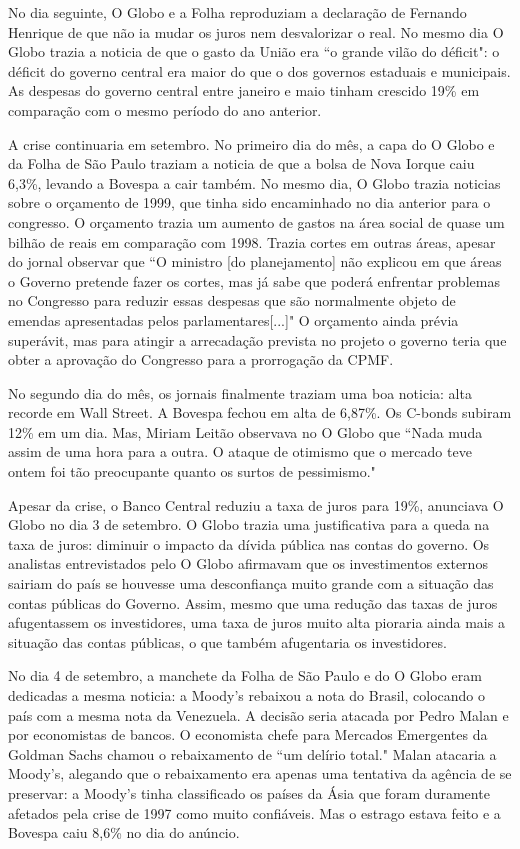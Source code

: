 \documentclass{article}
\begin{document}
No dia seguinte, O Globo e a Folha reproduziam a declaração de Fernando Henrique de que não ia mudar os juros nem desvalorizar o real. No mesmo dia O Globo trazia a noticia de que o gasto da União era ``o grande vilão do déficit": o déficit do governo central era maior do que o dos governos estaduais e municipais. As despesas do governo central entre janeiro e maio tinham crescido 19\% em comparação com o mesmo período do ano anterior.

A crise continuaria em setembro. No primeiro dia do mês, a capa do O Globo e da Folha de São Paulo traziam a noticia de que a bolsa de Nova Iorque caiu 6,3\%, levando a Bovespa a cair também. No mesmo dia, O Globo trazia noticias sobre o orçamento de 1999, que tinha sido encaminhado no dia anterior para o congresso. O orçamento trazia um aumento de gastos na área social de quase um bilhão de reais em comparação com 1998. Trazia cortes em outras áreas, apesar do jornal observar que ``O ministro [do planejamento] não explicou em que áreas o Governo pretende fazer os cortes, mas já sabe que poderá enfrentar problemas no Congresso para reduzir essas despesas que são normalmente objeto de emendas apresentadas pelos parlamentares[...]" O orçamento ainda prévia superávit, mas para atingir a arrecadação prevista no projeto o governo teria que obter a aprovação do Congresso para a prorrogação da CPMF.

No segundo dia do mês, os jornais finalmente traziam uma boa noticia: alta recorde em Wall Street. A Bovespa fechou em alta de 6,87\%. Os C-bonds subiram 12\% em um dia. Mas, Miriam Leitão observava no O Globo que ``Nada muda assim de uma hora para a outra. O ataque de otimismo que o mercado teve ontem foi tão preocupante quanto os surtos de pessimismo."

Apesar da crise, o Banco Central reduziu a taxa de juros para 19\%, anunciava O Globo no dia 3 de setembro. O Globo trazia uma justificativa para a queda na taxa de juros: diminuir o impacto da dívida pública nas contas do governo. Os analistas entrevistados pelo O Globo afirmavam que os investimentos externos sairiam do país se houvesse uma desconfiança muito grande com a situação das contas públicas do Governo. Assim, mesmo que uma redução das taxas de juros afugentassem os investidores, uma taxa de juros muito alta pioraria ainda mais a situação das contas públicas, o que também afugentaria os investidores.

No dia 4 de setembro, a manchete da Folha de São Paulo e do O Globo eram dedicadas a mesma noticia: a Moody's rebaixou a nota do Brasil, colocando o país com a mesma nota da Venezuela. A decisão seria atacada por Pedro Malan e por economistas de bancos. O economista chefe para Mercados Emergentes da Goldman Sachs chamou o rebaixamento de ``um delírio total." Malan atacaria a Moody's, alegando que o rebaixamento era apenas uma tentativa da agência de se preservar: a Moody's tinha classificado os países da Ásia que foram duramente afetados pela crise de 1997 como muito confiáveis. Mas o estrago estava feito e a Bovespa caiu 8,6\% no dia do anúncio.
\end{document}
